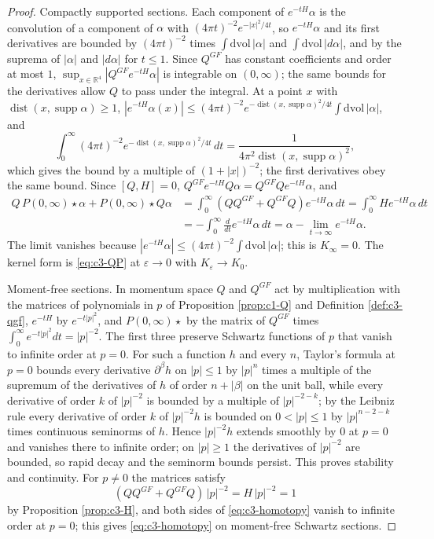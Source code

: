 \begin{proof}
Compactly supported sections. Each component of $e^{-tH}\alpha$ is the convolution of a component of $\alpha$ with $(4\pi t)^{-2}e^{-|x|^2/4t}$, so $e^{-tH}\alpha$ and its first derivatives are bounded by $(4\pi t)^{-2}$ times $\int\mathrm{dvol}\,|\alpha|$ and $\int\mathrm{dvol}\,|d\alpha|$, and by the suprema of $|\alpha|$ and $|d\alpha|$ for $t\le1$. Since $Q^{GF}$ has constant coefficients and order at most $1$, $\sup_{x\in\mathbb R^4}|Q^{GF}e^{-tH}\alpha|$ is integrable on $(0,\infty)$; the same bounds for the derivatives allow $Q$ to pass under the integral. At a point $x$ with $\operatorname{dist}(x,\operatorname{supp}\alpha)\ge1$, $|e^{-tH}\alpha(x)|\le(4\pi t)^{-2}e^{-\operatorname{dist}(x,\operatorname{supp}\alpha)^2/4t}\int\mathrm{dvol}\,|\alpha|$, and
\[
\int_0^\infty(4\pi t)^{-2}e^{-\operatorname{dist}(x,\operatorname{supp}\alpha)^2/4t}\,dt=\frac{1}{4\pi^2\operatorname{dist}(x,\operatorname{supp}\alpha)^2},
\]
which gives the bound by a multiple of $(1+|x|)^{-2}$; the first derivatives obey the same bound. Since $[Q,H]=0$, $Q^{GF}e^{-tH}Q\alpha=Q^{GF}Qe^{-tH}\alpha$, and
\[
\begin{aligned}
Q\,P(0,\infty)\star\alpha+P(0,\infty)\star Q\alpha&=\int_0^\infty(QQ^{GF}+Q^{GF}Q)e^{-tH}\alpha\,dt=\int_0^\infty He^{-tH}\alpha\,dt\\
&=-\int_0^\infty\frac{d}{dt}e^{-tH}\alpha\,dt=\alpha-\lim_{t\to\infty}e^{-tH}\alpha .
\end{aligned}
\]
The limit vanishes because $|e^{-tH}\alpha|\le(4\pi t)^{-2}\int\mathrm{dvol}\,|\alpha|$; this is $K_\infty=0$. The kernel form is \eqref{eq:c3-QP} at $\varepsilon\to0$ with $K_\varepsilon\to K_0$.

Moment-free sections. In momentum space $Q$ and $Q^{GF}$ act by multiplication with the matrices of polynomials in $p$ of Proposition \ref{prop:c1-Q} and Definition \ref{def:c3-qgf}, $e^{-tH}$ by $e^{-t|p|^2}$, and $P(0,\infty)\star$ by the matrix of $Q^{GF}$ times $\int_0^\infty e^{-t|p|^2}dt=|p|^{-2}$. The first three preserve Schwartz functions of $p$ that vanish to infinite order at $p=0$. For such a function $h$ and every $n$, Taylor's formula at $p=0$ bounds every derivative $\partial^\beta h$ on $|p|\le1$ by $|p|^n$ times a multiple of the supremum of the derivatives of $h$ of order $n+|\beta|$ on the unit ball, while every derivative of order $k$ of $|p|^{-2}$ is bounded by a multiple of $|p|^{-2-k}$; by the Leibniz rule every derivative of order $k$ of $|p|^{-2}h$ is bounded on $0<|p|\le1$ by $|p|^{n-2-k}$ times continuous seminorms of $h$. Hence $|p|^{-2}h$ extends smoothly by $0$ at $p=0$ and vanishes there to infinite order; on $|p|\ge1$ the derivatives of $|p|^{-2}$ are bounded, so rapid decay and the seminorm bounds persist. This proves stability and continuity. For $p\neq0$ the matrices satisfy
\[
(QQ^{GF}+Q^{GF}Q)\,|p|^{-2}=H\,|p|^{-2}=1
\]
by Proposition \ref{prop:c3-H}, and both sides of \eqref{eq:c3-homotopy} vanish to infinite order at $p=0$; this gives \eqref{eq:c3-homotopy} on moment-free Schwartz sections.


\end{proof}
